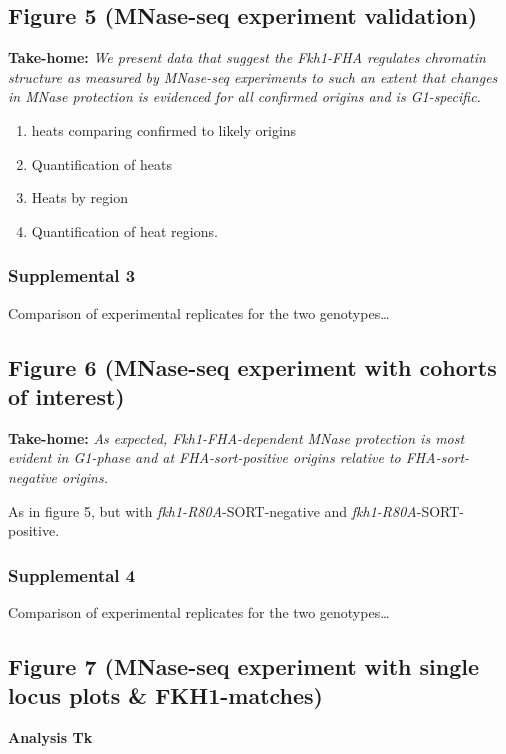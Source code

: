 \documentclass[
]{article}
\providecommand{\tightlist}{%
  \setlength{\itemsep}{0pt}\setlength{\parskip}{0pt}}
\begin{document}
\hypertarget{figure-5-mnase-seq-experiment-validation}{%
\subsection{Figure 5 (MNase-seq experiment validation)}\label{figure-5-mnase-seq-experiment-validation}}

\textbf{Take-home:} \emph{We present data that suggest the Fkh1-FHA regulates chromatin structure as measured by MNase-seq experiments to such an extent that changes in MNase protection is evidenced for all confirmed origins and is G1-specific.}

\begin{enumerate}
\def\labelenumi{\alph{enumi})}
\tightlist
\item
  heats comparing confirmed to likely origins~\\
\item
  Quantification of heats~\\
\item
  Heats by region~\\
\item
  Quantification of heat regions.~
\end{enumerate}

\hypertarget{supplemental-3}{%
\subsubsection{Supplemental 3}\label{supplemental-3}}

Comparison of experimental replicates for the two genotypes\ldots{}

\hypertarget{figure-6-mnase-seq-experiment-with-cohorts-of-interest}{%
\subsection{Figure 6 (MNase-seq experiment with cohorts of interest)}\label{figure-6-mnase-seq-experiment-with-cohorts-of-interest}}

\textbf{Take-home:} \emph{As expected, Fkh1-FHA-dependent MNase protection is most evident in G1-phase and at FHA-sort-positive origins relative to FHA-sort-negative origins.}

As in figure 5, but with \emph{fkh1-R80A}-SORT-negative and \emph{fkh1-R80A}-SORT-positive.~

\hypertarget{supplemental-4}{%
\subsubsection{Supplemental 4}\label{supplemental-4}}

Comparison of experimental replicates for the two genotypes\ldots{}

\hypertarget{figure-7-mnase-seq-experiment-with-single-locus-plots-fkh1-matches}{%
\subsection{Figure 7 (MNase-seq experiment with single locus plots \& FKH1-matches)}\label{figure-7-mnase-seq-experiment-with-single-locus-plots-fkh1-matches}}

\textbf{Analysis Tk}
\end{document}
